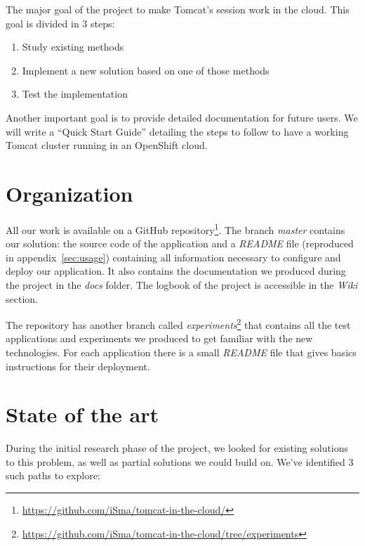 \documentclass[11pt,a4paper]{article}
\begin{document}
The major goal of the project to make Tomcat's session work in the cloud. This
goal is divided in 3 steps:
\begin{enumerate}
    \item Study existing methods
    \item Implement a new solution based on one of those methods
    \item Test the implementation
\end{enumerate}

Another important goal is to provide detailed documentation for future users.
We will write a ``Quick Start Guide'' detailing the steps to follow to have a
working Tomcat cluster running in an OpenShift cloud.


\section{Organization}

All our work is available on a GitHub repository\footnote{\url{https://github.com/iSma/tomcat-in-the-cloud/}}. The branch \emph{master} contains our solution: the source code of the application and a \emph{README} file (reproduced in appendix~\ref{sec:usage}) containing all information necessary to configure and deploy our application. It also contains the documentation we produced during the project in the \emph{docs} folder. The logbook of the project is accessible in the \emph{Wiki} section.

The repository has another branch called \emph{experiments}\footnote{\url{https://github.com/iSma/tomcat-in-the-cloud/tree/experiments}} that contains all the test applications and experiments we produced to get familiar with the new technologies. For each application there is a small \emph{README} file that gives basics instructions for their deployment.



\section{State of the art}

During the initial research phase of the project, we looked for existing solutions to this problem, as well as partial solutions we could build on. We've identified 3 such paths to explore:
\end{document}
